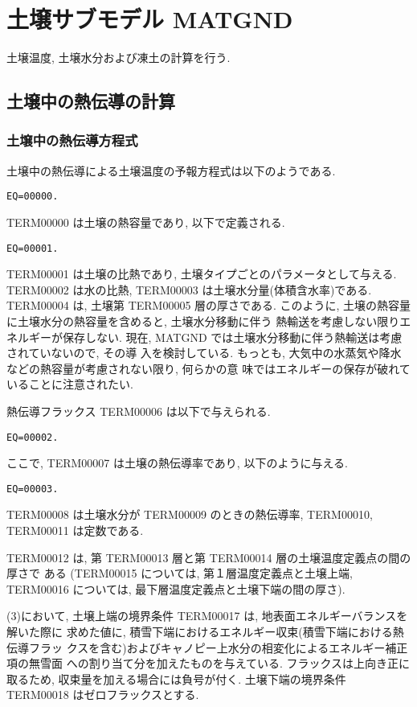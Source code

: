 \section{土壌サブモデル MATGND}

土壌温度, 土壌水分および凍土の計算を行う.

\subsection{土壌中の熱伝導の計算}

\subsubsection{土壌中の熱伝導方程式}

土壌中の熱伝導による土壌温度の予報方程式は以下のようである.
\begin{verbatim}
EQ=00000.
\end{verbatim}
TERM00000 は土壌の熱容量であり, 以下で定義される.
\begin{verbatim}
EQ=00001.
\end{verbatim}
TERM00001 は土壌の比熱であり, 土壌タイプごとのパラメータとして与える.
TERM00002 は水の比熱, TERM00003 は土壌水分量(体積含水率)である.
TERM00004 は, 土壌第 TERM00005 層の厚さである.
このように, 土壌の熱容量に土壌水分の熱容量を含めると, 土壌水分移動に伴う
熱輸送を考慮しない限りエネルギーが保存しない.
現在, MATGND では土壌水分移動に伴う熱輸送は考慮されていないので, その導
入を検討している.
もっとも, 大気中の水蒸気や降水などの熱容量が考慮されない限り, 何らかの意
味ではエネルギーの保存が破れていることに注意されたい.

熱伝導フラックス TERM00006 は以下で与えられる.
\begin{verbatim}
EQ=00002.
\end{verbatim}
ここで, TERM00007 は土壌の熱伝導率であり, 以下のように与える.
\begin{verbatim}
EQ=00003.
\end{verbatim}
TERM00008 は土壌水分が TERM00009 のときの熱伝導率, TERM00010,
TERM00011 は定数である.

TERM00012 は, 第 TERM00013 層と第 TERM00014 層の土壌温度定義点の間の厚さで
ある (TERM00015 については, 第１層温度定義点と土壌上端, TERM00016 については,
最下層温度定義点と土壌下端の間の厚さ).

(3)において,
土壌上端の境界条件 TERM00017 は, 地表面エネルギーバランスを解いた際に
求めた値に, 積雪下端におけるエネルギー収束(積雪下端における熱伝導フラッ
クスを含む)およびキャノピー上水分の相変化によるエネルギー補正項の無雪面
への割り当て分を加えたものを与えている. フラックスは上向き正に取るため,
収束量を加える場合には負号が付く.
土壌下端の境界条件 TERM00018 はゼロフラックスとする.

